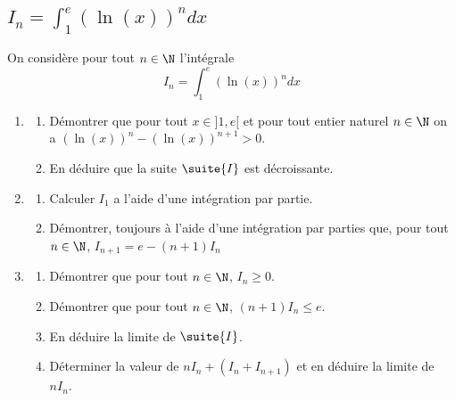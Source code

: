 \subsection{$I_n = \int_1^e (\ln(x))^n dx$}
\begin{exercice}
On considère pour tout $n\in \N$ l'intégrale 
$$I_n = \int_1^e (\ln(x))^n dx$$

\begin{enumerate}
\item \begin{enumerate}
\item Démontrer que pour tout $x\in ]1,e[ $ et pour tout entier naturel $n\in \N$ on  a $ (\ln(x))^n  - (\ln(x))^{n+1} >0$.
\item En déduire que la suite $\suite{I}$ est décroissante.
\end{enumerate}
\item \begin{enumerate}
\item Calculer $I_1$ a l'aide d'une intégration par partie. 
\item Démontrer, toujours à l'aide d'une intégration par parties que, pour tout $n\in \N$, $I_{n+1} = e- (n+1)I_n$
\end{enumerate}
\item \begin{enumerate}
\item Démontrer que pour tout $n\in \N$, $I_n\geq0$.
\item Démontrer que pour tout $n\in \N$, $(n+1) I_n\leq e$.
\item En déduire la limite de $\suite{I}$. 
\item Déterminer la valeur de $nI_n +(I_n+I_{n+1})$  et en déduire la limite de $nI_n$. 
\end{enumerate}
\end{enumerate}
\end{exercice}

